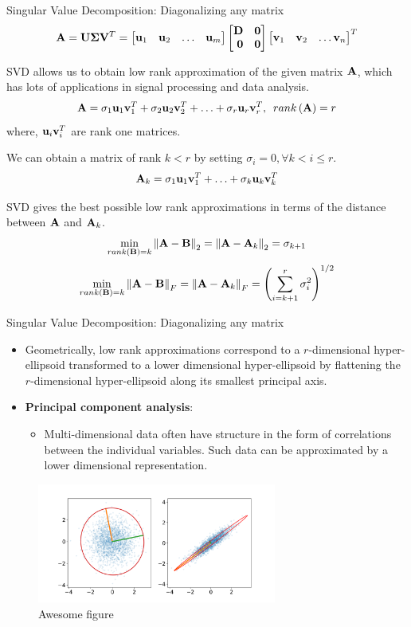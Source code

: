 \documentclass[aspectratio=169]{beamer}
\def\mf{\ensuremath\mathbf}
\def\lp{\ensuremath\left(}
\def\rp{\ensuremath\right)}
\def\lV{\ensuremath\left\lVert}
\def\rV{\ensuremath\right\rVert}
\def\bmx{\ensuremath\begin{bmatrix*}[r]}
\def\emx{\ensuremath\end{bmatrix*}}
\begin{document}
\begin{frame}[t]{Singular Value Decomposition: Diagonalizing any matrix}
\vspace{-0.5cm}
\[ \mf{A} = \mf{U}\mf{\Sigma}\mf{V}^T = \bmx \mf{u}_1 & \mf{u}_2 & \ldots & \mf{u}_m\emx \bmx \mf{D} & \mf{0}\\ \mf{0} & \mf{0} \emx \bmx \mf{v}_1 & \mf{v}_2 & \ldots \mf{v}_n \emx^T\]

SVD allows us to obtain low rank approximation of the given matrix $\mf{A}$, which has lots of applications in signal processing and data analysis.
\[ \mf{A} = \sigma_1\mf{u}_1\mf{v}_1^T + \sigma_2\mf{u}_2\mf{v}_2^T + \ldots + \sigma_r\mf{u}_r\mf{v}_r^T, \,\,\, rank\lp\mf{A}\rp = r \]
where, $\mf{u}_i\mf{v}_i^T$ are rank one matrices.

We can obtain a matrix of rank $k < r$ by setting $\sigma_i = 0, \forall k < i \leq r$.
\[ \mf{A}_{k} = \sigma_1\mf{u}_1\mf{v}_1^T + \ldots + \sigma_{k}\mf{u}_{k}\mf{v}_{k}^T \]

SVD gives the best possible low rank approximations in terms of the distance between $\mf{A}$ and $\mf{A}_k$.
\[ \min_{rank\lp\mf{B}\rp = k} \lV\mf{A} - \mf{B}\rV_2 = \lV\mf{A} - \mf{A}_k\rV_2 = \sigma_{k+1} \]\vspace{-0.4cm}
\[ \min_{rank\lp\mf{B}\rp = k} \lV\mf{A} - \mf{B}\rV_F = \lV\mf{A} - \mf{A}_k\rV_F = \lp\sum_{i=k+1}^{r}\sigma_{i}^2\rp^{1/2} \]
\end{frame}


\begin{frame}[t]{Singular Value Decomposition: Diagonalizing any matrix}
\vspace{-0.2cm}
\begin{itemize}
    \item Geometrically, low rank approximations correspond to a $r$-dimensional hyper-ellipsoid transformed to a lower dimensional hyper-ellipsoid by flattening the $r$-dimensional hyper-ellipsoid along its smallest principal axis.

    \item \textbf{Principal component analysis}:
    \begin{itemize}
        \item Multi-dimensional data often have structure in the form of correlations between the  individual variables. Such data can be approximated by a lower dimensional representation.
    \end{itemize}
\end{itemize}
\vspace{-0.4cm}
\begin{figure}
    \centering
    \includegraphics[width = 0.7\textwidth]{pca.png}
    \caption{Awesome figure}
\end{figure}
\end{frame}
\end{document}
